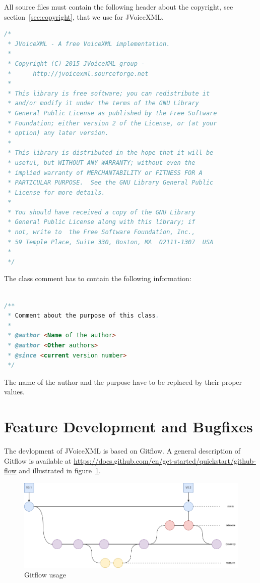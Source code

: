 \documentclass[11pt,a4paper]{article}
\begin{document}
All source files must contain the following header about the 
copyright, see section~\ref{sec:copyright}, that we use for JVoiceXML.

\begin{lstlisting}[language=Java]
/*
 * JVoiceXML - A free VoiceXML implementation.
 *
 * Copyright (C) 2015 JVoiceXML group - 
 *      http://jvoicexml.sourceforge.net
 *
 * This library is free software; you can redistribute it 
 * and/or modify it under the terms of the GNU Library 
 * General Public License as published by the Free Software 
 * Foundation; either version 2 of the License, or (at your 
 * option) any later version.
 *
 * This library is distributed in the hope that it will be 
 * useful, but WITHOUT ANY WARRANTY; without even the 
 * implied warranty of MERCHANTABILITY or FITNESS FOR A 
 * PARTICULAR PURPOSE.  See the GNU Library General Public 
 * License for more details.
 *
 * You should have received a copy of the GNU Library 
 * General Public License along with this library; if 
 * not, write to  the Free Software Foundation, Inc., 
 * 59 Temple Place, Suite 330, Boston, MA  02111-1307  USA
 *
 */
\end{lstlisting}

The class comment has to contain the following information:

\begin{lstlisting}[language=Java]

/**
 * Comment about the purpose of this class.
 *
 * @author <Name of the author>
 * @author <Other authors>
 * @since <current version number>
 */
\end{lstlisting}

The name of the author and the purpose have to be replaced by their proper
values.

\section{Feature Development and Bugfixes}

The devlopment of JVoiceXML is based on Gitflow. A general description of Gitflow is available
at \url{https://docs.github.com/en/get-started/quickstart/github-flow} and illustrated in
figure~\ref{fig:gitflow}.
\begin{figure}
\includegraphics[width=\linewidth]{gitflow.png}
\caption{Gitflow usage}
\label{fig:gitflow}
\end{figure}
\end{document}
